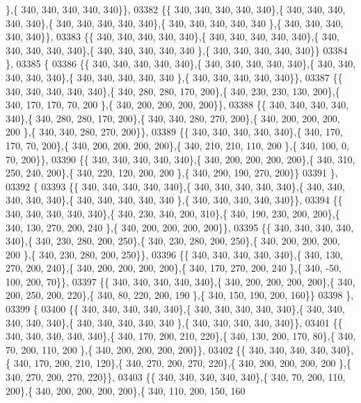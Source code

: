 \begin{DoxyCode}
      \},\{ 340, 340, 340, 340, 340\}\},
03382 \{\{ 340, 340, 340, 340, 340\},\{ 340, 340, 340, 340, 340\},\{ 340, 340, 340, 340, 340\},\{ 340, 340, 340, 340, 340
      \},\{ 340, 340, 340, 340, 340\}\},
03383 \{\{ 340, 340, 340, 340, 340\},\{ 340, 340, 340, 340, 340\},\{ 340, 340, 340, 340, 340\},\{ 340, 340, 340, 340, 340
      \},\{ 340, 340, 340, 340, 340\}\}
03384 \},
03385 \{
03386 \{\{ 340, 340, 340, 340, 340\},\{ 340, 340, 340, 340, 340\},\{ 340, 340, 340, 340, 340\},\{ 340, 340, 340, 340, 340
      \},\{ 340, 340, 340, 340, 340\}\},
03387 \{\{ 340, 340, 340, 340, 340\},\{ 340, 280, 280, 170, 200\},\{ 340, 230, 230, 130, 200\},\{ 340, 170, 170,  70, 200
      \},\{ 340, 200, 200, 200, 200\}\},
03388 \{\{ 340, 340, 340, 340, 340\},\{ 340, 280, 280, 170, 200\},\{ 340, 340, 280, 270, 200\},\{ 340, 200, 200, 200, 200
      \},\{ 340, 340, 280, 270, 200\}\},
03389 \{\{ 340, 340, 340, 340, 340\},\{ 340, 170, 170,  70, 200\},\{ 340, 200, 200, 200, 200\},\{ 340, 210, 210, 110, 200
      \},\{ 340, 100,   0,  70, 200\}\},
03390 \{\{ 340, 340, 340, 340, 340\},\{ 340, 200, 200, 200, 200\},\{ 340, 310, 250, 240, 200\},\{ 340, 220, 120, 200, 200
      \},\{ 340, 290, 190, 270, 200\}\}
03391 \},
03392 \{
03393 \{\{ 340, 340, 340, 340, 340\},\{ 340, 340, 340, 340, 340\},\{ 340, 340, 340, 340, 340\},\{ 340, 340, 340, 340, 340
      \},\{ 340, 340, 340, 340, 340\}\},
03394 \{\{ 340, 340, 340, 340, 340\},\{ 340, 230, 340, 200, 310\},\{ 340, 190, 230, 200, 200\},\{ 340, 130, 270, 200, 240
      \},\{ 340, 200, 200, 200, 200\}\},
03395 \{\{ 340, 340, 340, 340, 340\},\{ 340, 230, 280, 200, 250\},\{ 340, 230, 280, 200, 250\},\{ 340, 200, 200, 200, 200
      \},\{ 340, 230, 280, 200, 250\}\},
03396 \{\{ 340, 340, 340, 340, 340\},\{ 340, 130, 270, 200, 240\},\{ 340, 200, 200, 200, 200\},\{ 340, 170, 270, 200, 240
      \},\{ 340, -50, 100, 200,  70\}\},
03397 \{\{ 340, 340, 340, 340, 340\},\{ 340, 200, 200, 200, 200\},\{ 340, 200, 250, 200, 220\},\{ 340,  80, 220, 200, 190
      \},\{ 340, 150, 190, 200, 160\}\}
03398 \},
03399 \{
03400 \{\{ 340, 340, 340, 340, 340\},\{ 340, 340, 340, 340, 340\},\{ 340, 340, 340, 340, 340\},\{ 340, 340, 340, 340, 340
      \},\{ 340, 340, 340, 340, 340\}\},
03401 \{\{ 340, 340, 340, 340, 340\},\{ 340, 170, 200, 210, 220\},\{ 340, 130, 200, 170,  80\},\{ 340,  70, 200, 110, 200
      \},\{ 340, 200, 200, 200, 200\}\},
03402 \{\{ 340, 340, 340, 340, 340\},\{ 340, 170, 200, 210, 120\},\{ 340, 270, 200, 270, 220\},\{ 340, 200, 200, 200, 200
      \},\{ 340, 270, 200, 270, 220\}\},
03403 \{\{ 340, 340, 340, 340, 340\},\{ 340,  70, 200, 110, 200\},\{ 340, 200, 200, 200, 200\},\{ 340, 110, 200, 150, 160

\end{DoxyCode}
